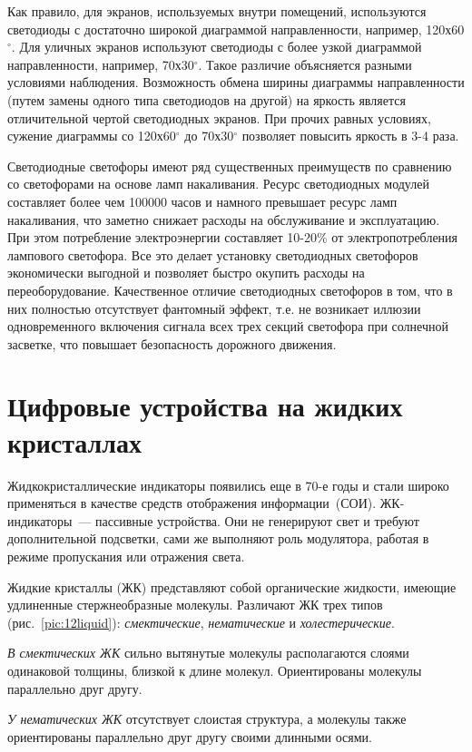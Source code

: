 Как правило, для экранов, используемых внутри помещений, используются светодиоды с достаточно широкой диаграммой направленности, например, 120х60$ ^\circ $. Для уличных экранов используют светодиоды с более узкой диаграммой направленности, например, 70х30$ ^\circ $. Такое различие объясняется разными условиями наблюдения. Возможность обмена ширины диаграммы направленности (путем замены одного типа светодиодов на другой) на яркость является отличительной чертой светодиодных экранов. При прочих равных условиях, сужение диаграммы со 120х60$ ^\circ $ до 70х30$ ^\circ $ позволяет повысить яркость в 3-4 раза.  

Светодиодные светофоры имеют ряд существенных преимуществ по сравнению со светофорами на основе ламп накаливания. Ресурс светодиодных модулей составляет более чем 100000 часов и намного превышает ресурс ламп накаливания, что заметно снижает расходы на обслуживание и эксплуатацию. При этом потребление электроэнергии составляет 10-20\% от электропотребления лампового светофора. Все это делает установку светодиодных светофоров экономически выгодной и позволяет быстро окупить расходы на переоборудование. Качественное отличие светодиодных светофоров в том, что в них полностью отсутствует фантомный эффект, т.е. не возникает иллюзии одновременного включения сигнала всех трех секций светофора при солнечной засветке, что повышает безопасность дорожного движения.

\section{Цифровые устройства на жидких кристаллах}

Жидкокристаллические индикаторы появились еще в 70-е годы и стали широко применяться в качестве средств отображения информации~(СОИ). ЖК-индикаторы~--- пассивные устройства. Они не генерируют свет и требуют дополнительной подсветки, сами же выполняют роль модулятора, работая в режиме пропускания или отражения света.

Жидкие кристаллы (ЖК) представляют собой органические жидкости, имеющие удлиненные стержнеобразные молекулы. Различают ЖК трех типов (рис.~\ref{pic:12liquid}): \textit{смектические}, \textit{нематические} и \textit{холестерические}.

\textit{В смектических ЖК} сильно вытянутые молекулы располагаются слоями одинаковой толщины, близкой к длине молекул. Ориентированы молекулы параллельно друг другу. 

\textit{У нематических ЖК} отсутствует слоистая структура, а молекулы также ориентированы параллельно друг другу своими длинными осями. 

